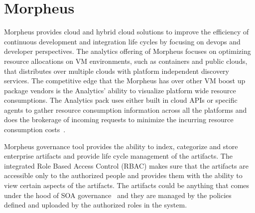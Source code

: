 \section{Morpheus}

Morpheus provides cloud and hybrid cloud solutions to improve the
efficiency of continuous development and integration life cycles by
focusing on devops and developer perspectives. The analytics offering
of Morpheus focuses on optimizing resource allocations on VM
environments, such as containers and public clouds, that distributes
over multiple clouds with platform independent discovery services. The
competitive edge that the Morpheus has over other VM boost up package
vendors is the Analytics' ability to visualize platform wide resource
consumptions. The Analytics pack uses either built in cloud APIs or
specific agents to gather resource consumption information across all
the platforms and does the brokerage of incoming requests to minimize
the incurring resource consumption
costs~\cite{hid-sp18-416-www-morpheus-product-guide}.

Morpheus governance tool provides the ability to index, categorize and
store enterprise artifacts and provide life cycle management of the
artifacts. The integrated Role Based Access Control (RBAC) makes sure
that the artifacts are accessible only to the authorized people and
provides them with the ability to view certain aspects of the
artifacts. The artifacts could be anything that comes under the hood
of SOA governance~\cite{hid-sp18-416-www-soa-governance-wikipedia} and
they are managed by the policies defined and uploaded by the
authorized roles in the system.
